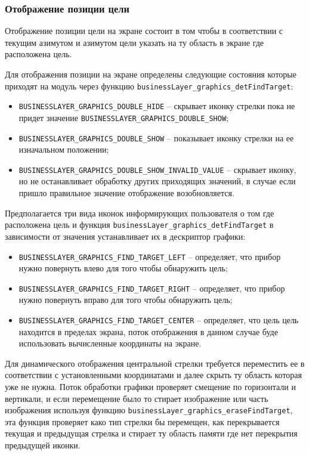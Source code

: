\subsubsection{Отображение позиции цели}

Отображение позиции цели на экране состоит в том чтобы в соответствии с текущим азимутом и азимутом цели указать на ту область в экране где расположена цель.

Для отображения позиции на экране определены следующие состояния которые приходят на модуль через функцию \lstinline{businessLayer_graphics_detFindTarget}:

\begin{itemize}
    \item \lstinline{BUSINESSLAYER_GRAPHICS_DOUBLE_HIDE} -- скрывает иконку стрелки пока не придет значение \lstinline{BUSINESSLAYER_GRAPHICS_DOUBLE_SHOW};
    \item \lstinline{BUSINESSLAYER_GRAPHICS_DOUBLE_SHOW} -- показывает иконку стрелки на ее изначальном положении;
    \item \lstinline{BUSINESSLAYER_GRAPHICS_DOUBLE_SHOW_INVALID_VALUE} -- скрывает иконку, но не останавливает обработку других приходящих значений, в случае если пришло правильное значение
    отображение возобновляется.
\end{itemize}

Предполагается три вида иконок информирующих пользователя о том где расположена цель и функция \lstinline{businessLayer_graphics_detFindTarget} в зависимости от значения устанавливает их
в дескриптор графики:

\begin{itemize}
    \item \lstinline{BUSINESSLAYER_GRAPHICS_FIND_TARGET_LEFT} -- определяет, что прибор нужно повернуть влево для того чтобы обнаружить цель;
    \item \lstinline{BUSINESSLAYER_GRAPHICS_FIND_TARGET_RIGHT} -- определяет, что прибор нужно повернуть вправо для того чтобы обнаружить цель; 
    \item \lstinline{BUSINESSLAYER_GRAPHICS_FIND_TARGET_CENTER} -- определяет, что цель цель находится в пределах экрана, поток отображения в данном случае буде использовать
    вычисленные координаты на экране.
\end{itemize}

Для динамического отображения центральной стрелки требуется переместить ее в соответствии с установленными координатами и далее скрыть ту область которая уже не нужна.
Поток обработки графики проверяет смещение по горизонтали и вертикали, и если перемещение было то стирает изображение или часть изображения используя функцию
\lstinline{businessLayer_graphics_eraseFindTarget}, эта функция проверяет како тип стрелки бы перемещен, как перекрывается текущая и предыдущая стрелка и стирает
ту область памяти где нет перекрытия предыдущей иконки. 

